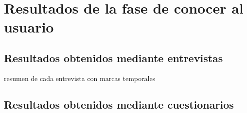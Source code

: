 \chapter{Resultados de la fase de conocer al usuario}
\section{Resultados obtenidos mediante entrevistas}
resumen de cada entrevista con marcas temporales
\section{Resultados obtenidos mediante cuestionarios}

